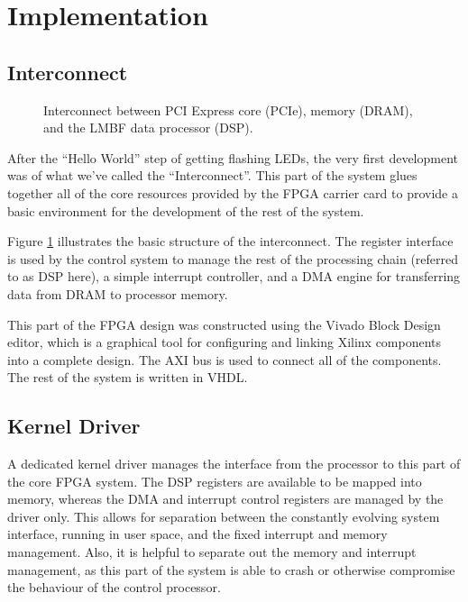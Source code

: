 \documentclass[
    a4paper,
    keeplastbox,            %
    hyphens,                %
    nospread,               %
]{jacow-2_1}
\newcommand{\squarecaption}[2][1]{\caption[#1]{#2\unskip\parfillskip 0pt}}
\begin{document}
\section{Implementation}


\subsection{Interconnect}

\begin{figure}
\begin{centering}

\end{centering}
\squarecaption{Interconnect between PCI Express core (PCIe), memory (DRAM), and
the LMBF data processor (DSP).}
\label{interconnect}
\end{figure}

After the ``Hello World'' step of getting flashing LEDs, the very first
development was of what we've called the ``Interconnect''.  This part of the
system glues together all of the core resources provided by the FPGA carrier
card to provide a basic environment for the development of the rest of the
system.

Figure \ref{interconnect} illustrates the basic structure of the interconnect.
The register interface is used by the control system to manage the rest of the
processing chain (referred to as DSP here), a simple interrupt controller, and a
DMA engine for transferring data from DRAM to processor memory.

This part of the FPGA design was constructed using the Vivado Block Design
editor, which is a graphical tool for configuring and linking Xilinx components
into a complete design.  The AXI bus is used to connect all of the components.
The rest of the system is written in VHDL.


\subsection{Kernel Driver}

A dedicated kernel driver manages the interface from the processor to this part
of the core FPGA system.  The DSP registers are available to be mapped into
memory, whereas the DMA and interrupt control registers are managed by the
driver only.  This allows for separation between the constantly evolving system
interface, running in user space, and the fixed interrupt and memory management.
Also, it is helpful to separate out the memory and interrupt management, as this
part of the system is able to crash or otherwise compromise the behaviour of the
control processor.
\end{document}

